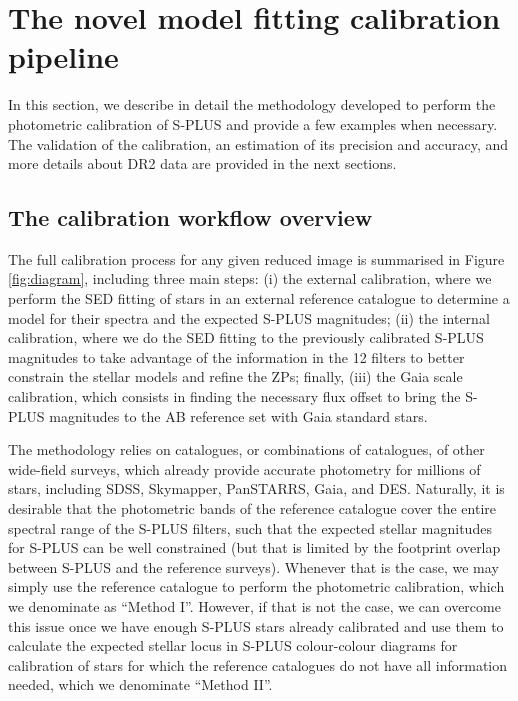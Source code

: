 \documentclass[fleqn,usenatbib]{mnras}
\begin{document}
\section{The novel model fitting calibration pipeline}
\label{sec::Calibration_description}


In this section, we describe in detail the methodology developed to perform the photometric calibration of S-PLUS and provide a few examples when necessary. The validation of the calibration, an estimation of its precision and accuracy, and more details about DR2 data are provided in the next sections.

\subsection{The calibration workflow overview}


The full calibration process for any given reduced image is summarised in Figure \ref{fig:diagram}, including three main steps: (i) the external calibration, where we perform the \ac{SED} fitting of stars in an external reference catalogue to determine a model for their spectra and the expected S-PLUS magnitudes; (ii) the internal calibration, where we do the SED fitting to the previously calibrated S-PLUS magnitudes to take advantage of the information in the 12 filters to better constrain the stellar models and refine the ZPs; finally, (iii) the Gaia scale calibration, which consists in finding the necessary flux offset to bring the S-PLUS magnitudes to the AB reference set with Gaia standard stars.

The methodology relies on catalogues, or combinations of catalogues, of other wide-field surveys, which already provide accurate photometry for millions of stars, including SDSS, Skymapper, PanSTARRS, Gaia, and DES. Naturally, it is desirable that the photometric bands of the reference catalogue cover the entire spectral range of the S-PLUS filters, such that the expected stellar magnitudes for S-PLUS can be well constrained (but that is limited by the footprint overlap between S-PLUS and the reference surveys). Whenever that is the case, we may simply use the reference catalogue to perform the photometric calibration, which we denominate as ``Method I''. However, if that is not the case, we can overcome this issue once we have enough S-PLUS stars already calibrated and use them to calculate the expected stellar locus in S-PLUS colour-colour diagrams for calibration of stars for which the reference catalogues do not have all information needed, which we denominate ``Method II''.
\end{document}
